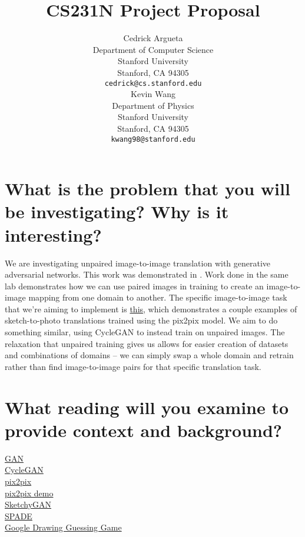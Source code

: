 \documentclass{article}
\title{CS231N Project Proposal}
\author{
  Cedrick Argueta \\
  Department of Computer Science\\
  Stanford University\\
  Stanford, CA 94305 \\
  \texttt{cedrick@cs.stanford.edu} \\
  \And
  Kevin Wang \\
  Department of Physics\\
  Stanford University\\
  Stanford, CA 94305 \\
  \texttt{kwang98@stanford.edu} \\
}
\begin{document}

\maketitle

\begin{abstract}

 
\end{abstract}


\section{What is the problem that you will be investigating? Why is it interesting?}

We are investigating unpaired image-to-image translation with generative adversarial networks.
This work was demonstrated in \cite{cycleGAN}.
Work done in the same lab \cite{pix2pix} demonstrates how we can use paired images in training to create an image-to-image mapping from one domain to another.
The specific image-to-image task that we're aiming to implement is \href{https://affinelayer.com/pixsrv/}{this}, which demonstrates a couple examples of sketch-to-photo translations trained using the pix2pix model.
We aim to do something similar, using CycleGAN to instead train on unpaired images.
The relaxation that unpaired training gives us allows for easier creation of datasets and combinations of domains -- we can simply swap a whole domain and retrain rather than find image-to-image pairs for that specific translation task.

\section{What reading will you examine to provide context and background?}

\href{https://arxiv.org/abs/1406.2661}{GAN} \\
\href{https://arxiv.org/pdf/1703.10593.pdf}{CycleGAN} \\
\href{https://arxiv.org/abs/1611.07004}{pix2pix} \\
\href{https://affinelayer.com/pixsrv/}{pix2pix demo} \\
\href{https://arxiv.org/abs/1801.02753}{SketchyGAN} \\
\href{https://arxiv.org/abs/1903.07291}{SPADE} \\
\href{https://quickdraw.withgoogle.com/}{Google Drawing Guessing Game} \\
\end{document}

